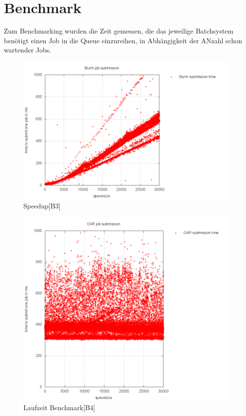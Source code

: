 \section{Benchmark}
	Zum Benchmarking wurden die Zeit gemessen, die das jeweilige Batchsystem benötigt
    einen Job in die Queue einzureihen, in Abhängigkeit der ANzahl schon wartender Jobs.\\
	\begin{figure}[H] \centering
		\includegraphics[scale=0.8]{../oar/output/pics/slurm.png} 
		\caption{Speedup[B3]}
	\end{figure}
	\newpage

	\begin{figure}[H]
		\centering
		\includegraphics[scale=0.8]{../oar/output/pics/oar.png} 
		\caption{Laufzeit Benchmark[B4]}
	\end{figure}
    \newpage 

